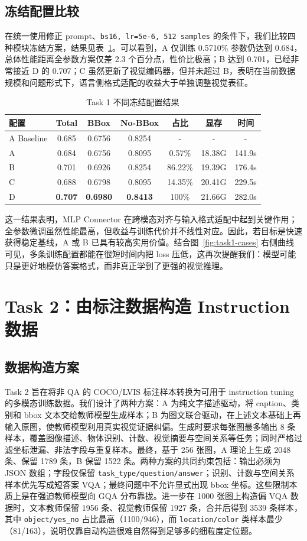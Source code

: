 \documentclass[9pt,twocolumn,a4paper]{ctexart}
\begin{document}
\subsection{冻结配置比较}
在统一使用修正 prompt、\texttt{bs16, lr=5e-6, 512 samples} 的条件下，我们比较四种模块冻结方案，结果见表~\ref{tab:task1-main}。可以看到，A 仅训练 0.5710\% 参数仍达到 0.684，总体性能距离全参数方案仅差 2.3 个百分点，性价比极高；B 达到 0.701，已经非常接近 D 的 0.707；C 虽然更新了视觉编码器，但并未超过 B，表明在当前数据规模和问题形式下，语言侧格式适配的收益大于单独调整视觉表征。

\begin{table}[H]
\centering
\caption{Task 1 不同冻结配置结果}
\label{tab:task1-main}
\scriptsize
\begin{tabular}{lcccccc}
\toprule
配置 & Total & BBox & No-BBox & 占比 & 显存 & 时间 \\
\midrule
A Baseline & 0.685 & 0.6756 & 0.8254 & - & - & - \\
A & 0.684 & 0.6756 & 0.8095 & 0.57\% & 18.38G & 141.9s \\
B & 0.701 & 0.6926 & 0.8254 & 86.22\% & 19.39G & 176.4s \\
C & 0.688 & 0.6798 & 0.8095 & 14.35\% & 20.41G & 229.5s \\
D & \textbf{0.707} & \textbf{0.6980} & \textbf{0.8413} & 100\% & 21.66G & 282.0s \\
\bottomrule
\end{tabular}
\end{table}

这一结果表明，MLP Connector 在跨模态对齐与输入格式适配中起到关键作用；全参数微调虽然性能最高，但收益与训练代价并不线性对应。因此，若目标是快速获得稳定基线，A 或 B 已具有较高实用价值。结合图~\ref{fig:task1-cases} 右侧曲线可见，多条训练配置都能在很短时间内把 loss 压低，这再次提醒我们：模型可能只是更好地模仿答案格式，而非真正学到了更强的视觉推理。

\section{Task 2：由标注数据构造 Instruction 数据}
\subsection{数据构造方案}
Task 2 旨在将非 QA 的 COCO/LVIS 标注样本转换为可用于 instruction tuning 的多模态训练数据。我们设计了两种方案：A 为纯文字描述驱动，将 caption、类别和 bbox 文本交给教师模型生成样本；B 为图文联合驱动，在上述文本基础上再输入原图，使教师模型利用真实视觉证据纠偏。生成时要求每张图最多输出 8 条样本，覆盖图像描述、物体识别、计数、视觉摘要与空间关系等任务；同时严格过滤坐标泄漏、非法字段与重复样本。最终，基于 256 张图，A 理论上生成 2048 条、保留 1789 条，B 保留 1522 条。两种方案的共同约束包括：输出必须为 JSON 数组；字段仅保留 \texttt{task\_type/question/answer}；识别、计数与空间关系样本优先写成短答案 VQA；最终问题中不允许显式出现 bbox 坐标。这些限制本质上是在强迫教师模型向 GQA 分布靠拢。进一步在 1000 张图上构造偏 VQA 数据时，文本教师保留 1956 条、视觉教师保留 1927 条，合并后得到 3539 条样本，其中 \texttt{object/yes\_no} 占比最高（1100/946），而 \texttt{location/color} 类样本最少（81/163），说明仅靠自动构造很难自然得到足够多的细粒度定位题。
\end{document}
